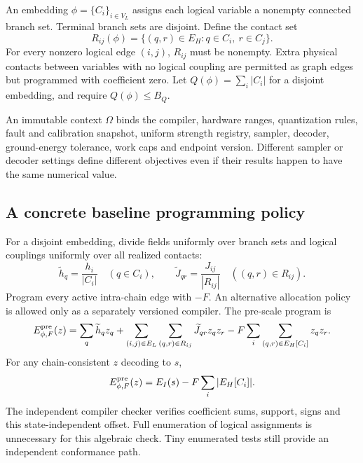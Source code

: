 \documentclass[11pt,a4paper]{article}
\theoremstyle{definition}\newtheorem{definition}[proposition]{Definition}
\begin{document}
An embedding $\phi=\{C_i\}_{i\in V_L}$ assigns each logical variable a nonempty connected branch set. Terminal branch sets are disjoint. Define the contact set
\begin{equation}
R_{ij}(\phi)=\{(q,r)\in E_H:q\in C_i,\ r\in C_j\}.
\end{equation}
For every nonzero logical edge $(i,j)$, $R_{ij}$ must be nonempty. Extra physical contacts between variables with no logical coupling are permitted as graph edges but programmed with coefficient zero. Let $Q(\phi)=\sum_i|C_i|$ for a disjoint embedding, and require $Q(\phi)\le B_Q$.

An immutable context $\Omega$ binds the compiler, hardware ranges, quantization rules, fault and calibration snapshot, uniform strength registry, sampler, decoder, ground-energy tolerance, work caps and endpoint version. Different sampler or decoder settings define different objectives even if their results happen to have the same numerical value.

\subsection{A concrete baseline programming policy}
For a disjoint embedding, divide fields uniformly over branch sets and logical couplings uniformly over all realized contacts:
\begin{equation}
\widetilde h_q=\frac{h_i}{|C_i|}\quad(q\in C_i),\qquad
\widetilde J_{qr}=\frac{J_{ij}}{|R_{ij}|}\quad((q,r)\in R_{ij}).
\end{equation}
Program every active intra-chain edge with $-F$. An alternative allocation policy is allowed only as a separately versioned compiler. The pre-scale program is
\begin{equation}
E^{\rm pre}_{\phi,F}(z)=\sum_q\widetilde h_qz_q+
\sum_{(i,j)\in E_L}\sum_{(q,r)\in R_{ij}}\widetilde J_{qr}z_qz_r
-F\sum_i\sum_{(q,r)\in E_H[C_i]}z_qz_r.
\end{equation}
For any chain-consistent $z$ decoding to $s$,
\begin{equation}
E^{\rm pre}_{\phi,F}(z)=E_I(s)-F\sum_i|E_H[C_i]|.
\label{eq:program-identity}
\end{equation}
The independent compiler checker verifies coefficient sums, support, signs and this state-independent offset. Full enumeration of logical assignments is unnecessary for this algebraic check. Tiny enumerated tests still provide an independent conformance path.
\end{document}
